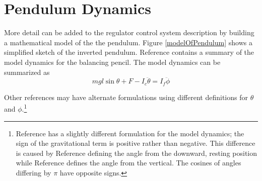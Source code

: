 \documentclass[12pt,letterpaper]{article}
\begin{document}
\section{Pendulum Dynamics}

More detail can be added to the regulator control system description by building a mathematical model of the the
pendulum.
Figure \ref{modelOfPendulum} shows a simplified sketch of the inverted pendulum.
Reference \cite{reactionWheel} contains a summary of the model dynamics for the balancing pencil.  
The model dynamics can be summarized as
%
\begin{equation}
    m g l \sin \theta + F - I_{c}\ddot{\theta}  = I_{f}\ddot{\phi}
\end{equation}
%


Other references may have alternate formulations using different definitions for $\theta$ and $\phi$.\footnote{Reference \cite{monograph} has a slightly different formulation for the model dynamics; 
the sign of the gravitational term is positive rather than negative.  This difference is caused 
by Reference \cite{monograph} defining the angle from the downward, resting position
while Reference \cite{reactionWheel} defines the angle from the vertical.  
The cosines of angles differing by $\pi$ have opposite signs.}\\
\end{document}
